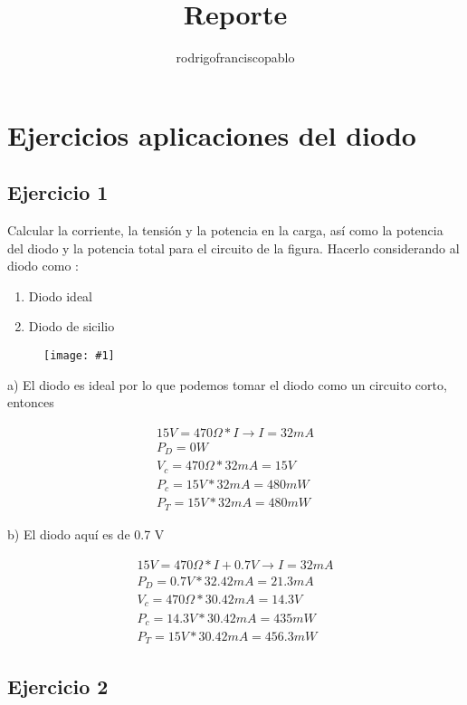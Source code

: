 \documentclass{mylib/reporteCorto}
\title{Reporte}
\author{rodrigofranciscopablo }
\newcommand{\insertImage}[2]{
	\begin{figure}[H]
		\centering
		\texttt{[image: \#1]}
	\end{figure}
}
\begin{document}
\coverPage

\tableofcontents
\newpage

\section{Ejercicios aplicaciones del diodo}

\subsection{Ejercicio 1}

Calcular la corriente, la tensión y la potencia en la carga, así como la potencia del diodo y la potencia total para
el circuito de la figura. Hacerlo considerando al diodo como :

\begin{enumerate}[label=\Alph*]
	\item Diodo ideal
	\item Diodo de sicilio
\end{enumerate}

\insertImage{img/dispos_serie2/appdiodo1}{15}


a) El diodo es ideal por lo que podemos tomar el diodo como un circuito corto, entonces

\begin{gather*}
	15 V = 470 \Omega * I \rightarrow I = 32 mA \\
	P_D = 0 W \\
	V_c = 470 \Omega *32 mA = 15 V \\
	P_c = 15V * 32 mA = 480 mW \\
	P_T = 15V * 32 mA = 480 mW
\end{gather*}

b) El diodo aquí es de 0.7 V

\begin{gather*}
	15 V = 470 \Omega * I + 0.7 V \rightarrow I = 32 mA \\
	P_D = 0.7V * 32.42 mA = 21.3 mA \\
	V_c = 470 \Omega *30.42 mA = 14.3 V \\
	P_c = 14.3V * 30.42 mA = 435 mW \\
	P_T = 15V * 30.42 mA = 456.3 mW
\end{gather*}

\subsection{Ejercicio 2}
\end{document}

